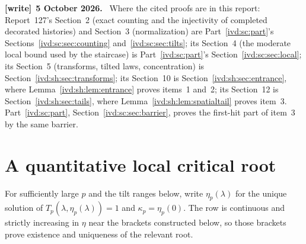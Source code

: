 \documentclass[11pt,letterpaper]{article}
\theoremstyle{remark}\newtheorem{remark}[theorem]{Remark}
\numberwithin{equation}{section}
\newenvironment{writenote}[1][]{\par\smallskip\begingroup\small
 \noindent\textbf{[write]}\if\relax\detokenize{#1}\relax\else~\textbf{#1.}\fi\ }%
 {\par\endgroup\smallskip}
\begin{document}
\begin{writenote}[5 October 2026]
Where the cited proofs are in this report: Report~127's Section~2 (exact counting and the injectivity of completed decorated histories) and Section~3 (normalization) are Part~\ref{ivd:sc:part}'s Sections~\ref{ivd:sc:sec:counting} and~\ref{ivd:sc:sec:tilts}; its Section~4 (the moderate local bound used by the staircase) is Part~\ref{ivd:sc:part}'s Section~\ref{ivd:sc:sec:local}; its Section~5 (transforms, tilted laws, concentration) is Section~\ref{ivd:sh:sec:transforms}; its Section~10 is Section~\ref{ivd:sh:sec:entrance}, where Lemma~\ref{ivd:sh:lem:entrance} proves items~1 and~2; its Section~12 is Section~\ref{ivd:sh:sec:tails}, where Lemma~\ref{ivd:sh:lem:spatialtail} proves item~3. Part~\ref{ivd:sc:part}, Section~\ref{ivd:sc:sec:barrier}, proves the first-hit part of item~3 by the same barrier.
\end{writenote}

\section{A quantitative local critical root}\label{ivd:ll:sec:root}
For sufficiently large $p$ and the tilt ranges below, write
$\eta_p(\lambda)$ for the unique solution of
$T_p(\lambda,\eta_p(\lambda))=1$ and $\kappa_p=\eta_p(0)$.
The row is continuous and strictly increasing in $\eta$ near the
brackets constructed below, so those brackets prove existence and
uniqueness of the relevant root.
\end{document}
